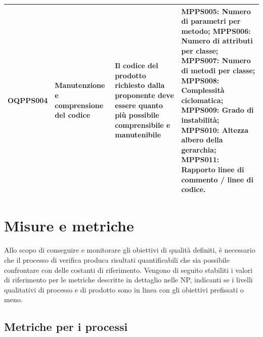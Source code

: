 \documentclass[openany,12pt,a4paper]{report}
\begin{document}
\begin{longtable}{| p{2cm} | p{3.5cm} |p{5.5cm} | p{5.5cm} |}
        	\hline
        	\newline OQPPS004 &
        	\newline Manutenzione e comprensione del codice &
        	\newline Il codice del prodotto richiesto dalla proponente deve essere quanto più possibile comprensibile e manutenibile \newline &
        	\newline MPPS005: Numero di parametri per metodo;
        	\newline MPPS006: Numero di attributi per classe;
        	\newline MPPS007: Numero di metodi per classe;
        	\newline MPPS008: Complessità ciclomatica;
        	\newline MPPS009: Grado di instabilità;
        	\newline MPPS010: Altezza albero della gerarchia;
        	\newline MPPS011: Rapporto linee di commento / linee di codice.
        	\\[1em]
        	
        	\hline
        \end{longtable}
    
	
	\section{Misure e metriche}
	
	Allo scopo di conseguire e monitorare gli obiettivi di qualità definiti, è necessario che il processo di verifica produca risultati quantificabili che sia possibile confrontare con delle costanti di riferimento. Vengono di seguito stabiliti i valori di riferimento per le metriche descritte in dettaglio nelle NP, indicanti se i livelli qualitativi di processo e di prodotto sono in linea con gli obiettivi prefissati o meno. 	
	
	
	\subsection{Metriche per i processi}
	
\end{document}
